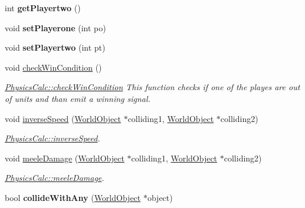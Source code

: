 \begin{DoxyCompactItemize}
\item 
int {\bfseries get\+Playertwo} ()\hypertarget{class_physics_calc_a8d963098593c28d7190ee446f4c50979}{}\label{class_physics_calc_a8d963098593c28d7190ee446f4c50979}

\item 
void {\bfseries set\+Playerone} (int po)\hypertarget{class_physics_calc_aa7d4402c26a08de3580466533eb27cdc}{}\label{class_physics_calc_aa7d4402c26a08de3580466533eb27cdc}

\item 
void {\bfseries set\+Playertwo} (int pt)\hypertarget{class_physics_calc_a4f152ef88ebf3fad24db71508ee54690}{}\label{class_physics_calc_a4f152ef88ebf3fad24db71508ee54690}

\item 
void \hyperlink{class_physics_calc_a611a891e2f01de112884cc09f25d1e33}{check\+Win\+Condition} ()\hypertarget{class_physics_calc_a611a891e2f01de112884cc09f25d1e33}{}\label{class_physics_calc_a611a891e2f01de112884cc09f25d1e33}

\begin{DoxyCompactList}\small\item\em \hyperlink{class_physics_calc_a611a891e2f01de112884cc09f25d1e33}{Physics\+Calc\+::check\+Win\+Condition} This function checks if one of the playes are out of units and than emit a winning signal. \end{DoxyCompactList}\item 
void \hyperlink{class_physics_calc_a22379e7ef119411e03fc8c4ba211c724}{inverse\+Speed} (\hyperlink{class_world_object}{World\+Object} $\ast$colliding1, \hyperlink{class_world_object}{World\+Object} $\ast$colliding2)
\begin{DoxyCompactList}\small\item\em \hyperlink{class_physics_calc_a22379e7ef119411e03fc8c4ba211c724}{Physics\+Calc\+::inverse\+Speed}. \end{DoxyCompactList}\item 
void \hyperlink{class_physics_calc_a10a603c3fb290521b301a19600c067c4}{meele\+Damage} (\hyperlink{class_world_object}{World\+Object} $\ast$colliding1, \hyperlink{class_world_object}{World\+Object} $\ast$colliding2)
\begin{DoxyCompactList}\small\item\em \hyperlink{class_physics_calc_a10a603c3fb290521b301a19600c067c4}{Physics\+Calc\+::meele\+Damage}. \end{DoxyCompactList}\item 
bool {\bfseries collide\+With\+Any} (\hyperlink{class_world_object}{World\+Object} $\ast$object)\hypertarget{class_physics_calc_a8529b4af50316ef96a6bcbd029c39077}{}\label{class_physics_calc_a8529b4af50316ef96a6bcbd029c39077}


\end{DoxyCompactItemize}
